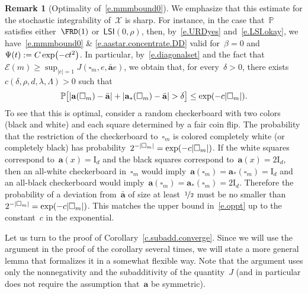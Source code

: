 \documentclass[11pt,twoside]{article} %
\let\oldsquare\square %
\renewcommand{\square}{\oldsquare}
\numberwithin{equation}{section}
\theoremstyle{definition}
\newtheorem{remark}[theorem]{Remark}
\let\originalleft\left
\let\originalright\right
\renewcommand{\left}{\mathopen{}\mathclose\bgroup\originalleft}
\renewcommand{\right}{\aftergroup\egroup\originalright}
\newcommand*{\Id}{\ensuremath{\mathrm{I}_d}}
\renewcommand{\a}{\mathbf{a}}
\newcommand{\ahom}{\bar{\a}}
\newcommand{\cu}{\square}
\renewcommand{\P}{\mathbb{P}}
\newcommand{\X}{\mathcal{X}}
\newcommand{\LSI}{\mathsf{LSI}}
\begin{document}
\begin{remark}[{Optimality of~\eqref{e.mmmbound0}}]
\label{r.X.optimal}
We emphasize that this estimate for the stochastic integrability of~$\X$ is sharp. 
For instance, in the case that~$\P$ satisfies either~$\FRD(1)$ or~$\LSI(0,\rho)$, then, by~\eqref{e.URDyes} and~\eqref{e.LSI.okay}, we have~\eqref{e.mmmbound0} \& \eqref{e.aastar.concentrate.DD} valid for~$\beta=0$ and~$\Psi(t):= C\exp\left( -ct^2 \right)$. 
In particular, by~\eqref{e.diagonalset} and the fact that~$\mathcal{E}(m) \geq \sup_{|e|=1} J(\cu_m,e,\ahom e)$, we obtain that, for every~$\delta>0$, there exists~$c(\delta,\rho,d,\lambda,\Lambda)>0$ such that 
\begin{equation} 
\label{e.oppt}
\P \bigl[  
\left| \a(\cu_m) - \ahom \right|
+ \left| \a_*(\cu_m) - \ahom \right|
> \delta 
\bigr]
\leq \exp \left( -c\left| \cu_m \right| \right). 
\end{equation}
To see that this is optimal, consider a random checkerboard with two colors (black and white) and each square determined by a fair coin flip. The probability that the restriction of the checkerboard to~$\cu_m$ is colored completely white (or completely black) has probability~$2^{-|\cu_m|} = \exp\left( -c\left| \cu_m\right| \right)$. If the white squares correspond to~$\a(x) =  \Id$ and the black squares correspond to~$\a(x) =2 \Id$, then an all-white checkerboard in~$\cu_m$ would imply~$\a(\cu_m) = \a_*(\cu_m) =  \Id$ and an all-black checkerboard would imply~$\a(\cu_m) = \a_*(\cu_m) =2  \Id$. Therefore the probability of a deviation from~$\ahom$ of size at least~$\nicefrac12$ must be no smaller than~$2^{-|\cu_m|} = \exp\left( -c\left| \cu_m\right| \right)$. This matches the upper bound in~\eqref{e.oppt} up to the constant~$c$ in the exponential. 
\end{remark}








Let us turn to the proof of Corollary~\ref{c.subadd.converge}. 
Since we will use the argument in the proof of the corollary several times, we will state a more general lemma that formalizes it in a somewhat flexible way. Note that the argument uses only the nonnegativity and the subadditivity of the quantity~$J$ (and in particular does not require the assumption that~$\a$ be symmetric). 
\end{document}
